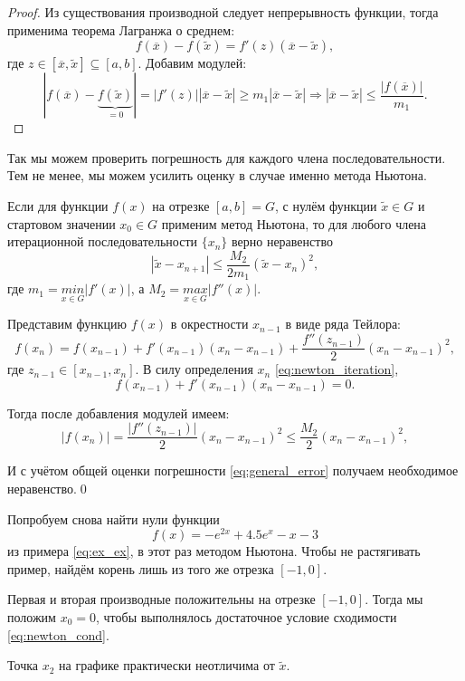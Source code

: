 \documentclass[../main.tex]{subfile}
\begin{document}
\begin{proof}
	Из существования производной следует непрерывность функции, тогда
	применима теорема Лагранжа о среднем:
	\[f(\overline{x})-f(\widetilde{x})=f'(z)(\overline{x}-\widetilde{x}),\]
	где $z\in[\overline{x},\widetilde{x}]\subseteq[a,b]$. Добавим модулей:
	\[|f(\overline{x})-\underset{=0}{\underbrace{f(\widetilde{x})}}|=|f'(z)|
		|\overline{x}-\widetilde{x}|\ge m_1|\overline{x}-\widetilde{x}|
		\Rightarrow |\overline{x}-\widetilde{x}|\le
		\frac{|f(\overline{x})|}{m_1}.\]
\end{proof}

Так мы можем проверить погрешность для каждого члена последовательности. Тем не
менее, мы можем усилить оценку в случае именно метода Ньютона.

\begin{theorem}
	Если для функции $f(x)$ на отрезке $[a,b]=G$, с нулём функции
	$\widetilde{x}\in G$ и стартовом значении $x_0\in G$ применим метод
	Ньютона, то для любого члена итерационной последовательности $\{x_n\}$
	верно неравенство
	\[\boxed{|\widetilde{x}-x_{n+1}|\le \frac{M_2}{2m_1}
	(\widetilde{x}-x_n)^2},\]
	где $m_1=\underset{x\in G}{min}|f'(x)|$, а $M_2=\underset{x\in G}{max}
	|f''(x)|$.
\end{theorem}

\beginproof

	Представим функцию $f(x)$ в окрестности $x_{n-1}$ в виде ряда Тейлора:
	\[f(x_n)=f(x_{n-1})+f'(x_{n-1})(x_n-x_{n-1})+\frac{f''(z_{n-1})}{2}
	(x_n-x_{n-1})^2,\]
	где $z_{n-1}\in[x_{n-1},x_n]$. В силу определения $x_n$
	\eqref{eq:newton_iteration},
	\[f(x_{n-1})+f'(x_{n-1})(x_n-x_{n-1})=0.\]

	Тогда после добавления модулей имеем:
	\[|f(x_n)|=\frac{|f''(z_{n-1})|}{2}(x_n-x_{n-1})^2\le \frac{M_2}{2}
	(x_n-x_{n-1})^2,\]

	И с учётом общей оценки погрешности \eqref{eq:general_error} получаем
	необходимое неравенство.\qed

\begin{example}
	Попробуем снова найти нули функции
	\[f(x)=-e^{2x}+4.5e^x-x-3\]
	из примера \eqref{eq:ex_ex}, в этот раз методом Ньютона. Чтобы не
	растягивать пример, найдём корень лишь из того же отрезка $[-1,0]$.

	Первая и вторая производные положительны на отрезке $[-1,0]$. Тогда
	мы положим $x_0=0$, чтобы выполнялось достаточное условие сходимости
	\eqref{eq:newton_cond}.
	

	Точка $x_2$ на графике практически неотличима от $\widetilde{x}$.
\end{example}
\end{document}
